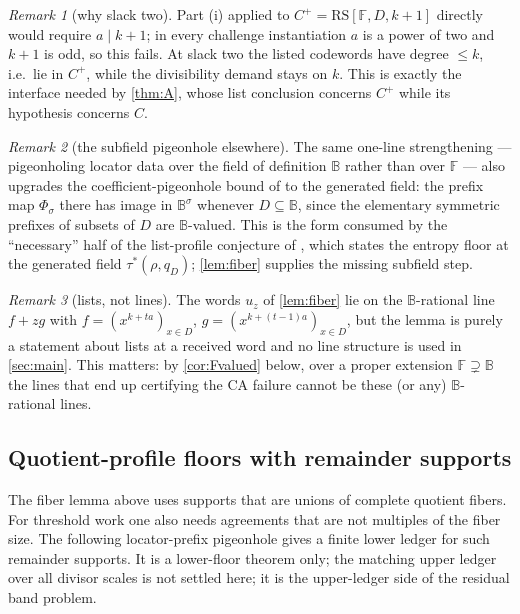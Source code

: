 \documentclass[11pt]{article}
\theoremstyle{definition}
\theoremstyle{remark}
\newtheorem{remark}[remark]{Remark}
\newcommand{\F}{\mathbb{F}}
\newcommand{\B}{\mathbb{B}}
\newcommand{\RS}{\mathrm{RS}}
\begin{document}
\begin{remark}[why slack two]\label{rem:slacktwo}
Part (i) applied to $C^+=\RS[\F,D,k+1]$ directly would require $a\mid k+1$; in every challenge instantiation $a$ is a power of two and $k+1$ is odd, so this fails. At slack two the listed codewords have degree $\le k$, i.e.\ lie in $C^+$, while the divisibility demand stays on $k$. This is exactly the interface needed by \cref{thm:A}, whose list conclusion concerns $C^+$ while its hypothesis concerns $C$.
\end{remark}

\begin{remark}[the subfield pigeonhole elsewhere]\label{rem:subpigeon}
The same one-line strengthening --- pigeonholing locator data over the field of definition $\B$ rather than over $\F$ --- also upgrades the coefficient-pigeonhole bound of \cite{Cho26b} to the generated field: the prefix map $\Phi_\sigma$ there has image in $\B^\sigma$ whenever $D\subseteq\B$, since the elementary symmetric prefixes of subsets of $D$ are $\B$-valued. This is the form consumed by the ``necessary'' half of the list-profile conjecture of \cite{Cho26b}, which states the entropy floor at the generated field $\tau^{*}(\rho,q_D)$; \cref{lem:fiber} supplies the missing subfield step.
\end{remark}

\begin{remark}[lists, not lines]\label{rem:lines}
The words $u_z$ of \cref{lem:fiber} lie on the $\B$-rational line $f+zg$ with $f=(x^{k+ta})_{x\in D}$, $g=(x^{k+(t-1)a})_{x\in D}$, but the lemma is purely a statement about lists at a received word and no line structure is used in \cref{sec:main}. This matters: by \cref{cor:Fvalued} below, over a proper extension $\F\supsetneq\B$ the lines that end up certifying the CA failure cannot be these (or any) $\B$-rational lines.
\end{remark}

\subsection{Quotient-profile floors with remainder supports}
\label{sec:quotient-remainder}

The fiber lemma above uses supports that are unions of complete quotient fibers.
For threshold work one also needs agreements that are not multiples of the fiber
size.  The following locator-prefix pigeonhole gives a finite lower ledger for
such remainder supports.  It is a lower-floor theorem only; the matching upper
ledger over all divisor scales is not settled here; it is the upper-ledger side of the residual band problem.
\end{document}
